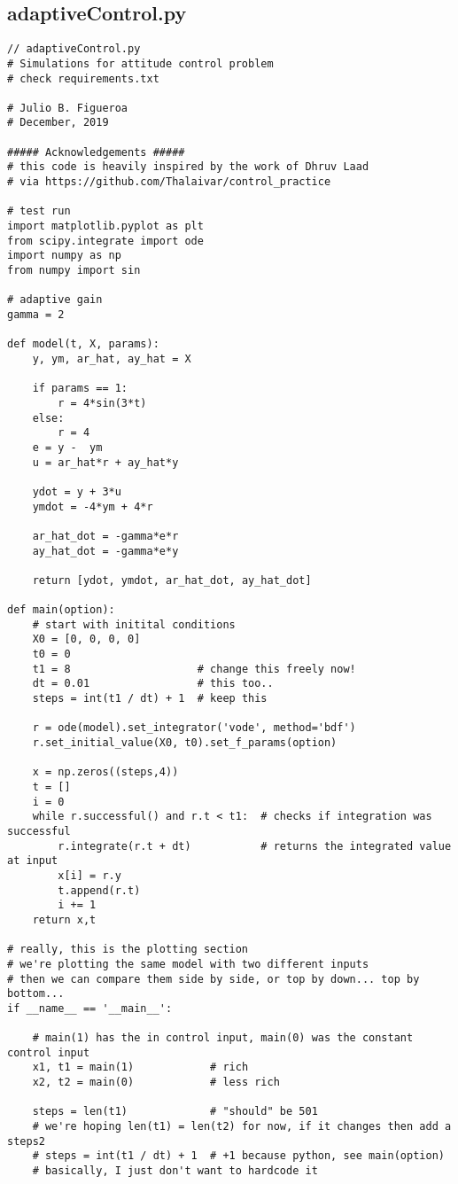 \documentclass{article}
\begin{document}
\subsection{adaptiveControl.py}
\begin{lstlisting}
// adaptiveControl.py
# Simulations for attitude control problem
# check requirements.txt

# Julio B. Figueroa
# December, 2019

##### Acknowledgements #####
# this code is heavily inspired by the work of Dhruv Laad
# via https://github.com/Thalaivar/control_practice

# test run
import matplotlib.pyplot as plt
from scipy.integrate import ode
import numpy as np
from numpy import sin

# adaptive gain
gamma = 2

def model(t, X, params):
    y, ym, ar_hat, ay_hat = X

    if params == 1:
        r = 4*sin(3*t)
    else:
        r = 4
    e = y -  ym
    u = ar_hat*r + ay_hat*y

    ydot = y + 3*u
    ymdot = -4*ym + 4*r

    ar_hat_dot = -gamma*e*r
    ay_hat_dot = -gamma*e*y

    return [ydot, ymdot, ar_hat_dot, ay_hat_dot]

def main(option):
    # start with initital conditions
    X0 = [0, 0, 0, 0]
    t0 = 0
    t1 = 8                    # change this freely now!
    dt = 0.01                 # this too..
    steps = int(t1 / dt) + 1  # keep this

    r = ode(model).set_integrator('vode', method='bdf')
    r.set_initial_value(X0, t0).set_f_params(option)

    x = np.zeros((steps,4))
    t = []
    i = 0
    while r.successful() and r.t < t1:  # checks if integration was successful
        r.integrate(r.t + dt)           # returns the integrated value at input
        x[i] = r.y
        t.append(r.t)
        i += 1
    return x,t

# really, this is the plotting section
# we're plotting the same model with two different inputs
# then we can compare them side by side, or top by down... top by bottom...
if __name__ == '__main__':

    # main(1) has the in control input, main(0) was the constant control input
    x1, t1 = main(1)            # rich
    x2, t2 = main(0)            # less rich

    steps = len(t1)             # "should" be 501
    # we're hoping len(t1) = len(t2) for now, if it changes then add a steps2
    # steps = int(t1 / dt) + 1  # +1 because python, see main(option)
    # basically, I just don't want to hardcode it


\end{lstlisting}
\end{document}
